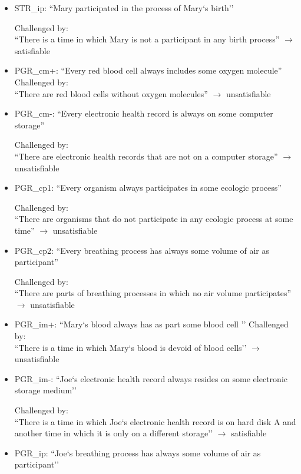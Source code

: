 \begin{itemize}
\item STR\_ip:  ``Mary participated in the process of Mary`s birth''

Challenged by: \\``There is a time in which Mary is not a participant in any birth process''  $\rightarrow$ satisfiable



\item PGR\_cm+: ``Every red blood cell always includes some oxygen molecule''
Challenged by: \\``There are red blood cells without oxygen molecules''  $\rightarrow$ unsatisfiable


\item PGR\_cm-: ``Every electronic health record is always on some computer storage''

Challenged by: \\``There are electronic health records that are not on a computer storage''  $\rightarrow$ unsatisfiable


\item PGR\_cp1: ``Every organism always participates in some ecologic process''

Challenged by: \\``There are organisms that do not participate in any ecologic process at some time''  $\rightarrow$ unsatisfiable


\item PGR\_cp2: ``Every breathing process has always some volume of air as participant'' 

Challenged by: \\``There are parts of breathing processes in which no air volume participates''  $\rightarrow$ unsatisfiable


\item PGR\_im+: ``Mary`s blood always has as part some blood cell ''
Challenged by: \\``There is a time in which Mary`s blood is devoid of blood cells''  $\rightarrow$ unsatisfiable

\item PGR\_im-: ``Joe`s electronic health record always resides on some electronic storage medium''

Challenged by: \\``There is a time in which Joe`s electronic health record is on hard disk A and another time in which it is only on a different storage''  
$\rightarrow$ satisfiable


\item PGR\_ip:  ``Joe`s breathing process has always some volume of air as participant''


\end{itemize}
